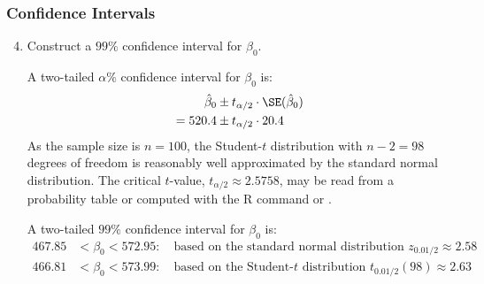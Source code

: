 \begin{frame}
\frametitle{Confidence Intervals}
\ask

\begin{enumerate}\setcounter{enumi}{3}

\item Construct a $99\%$ confidence interval for $\beta_{0}$.

\begin{answer}
A two-tailed $\alpha\%$ confidence interval for $\beta_{0}$ is: 
\begin{align*}
\hat{\beta}_{0} & \pm t_{\alpha/2} \cdot \SE(\hat{\beta}_{0}) \\
        = 520.4 & \pm t_{\alpha/2} \cdot 20.4 
\end{align*}
As the sample size is $n=100$, the Student-$t$ distribution with $n-2=98$ degrees of freedom is reasonably well approximated by the standard normal distribution. 
The critical $t$-value, $t_{\alpha/2}\approx2.5758$, may be read from a probability table or computed with the R command  or .

A two-tailed $99\%$ confidence interval for $\beta_{0}$ is:
\begin{align*}
467.85 & < \beta_{0} < 572.95
:\quad\text{based on the standard normal distribution $z_{0.01/2}\approx2.58$}\\
466.81 & < \beta_{0} < 573.99
:\quad\text{based on the Student-$t$ distribution $t_{0.01/2}(98)\approx2.63$}
\end{align*}
\end{answer}

\end{enumerate}
\end{frame}



